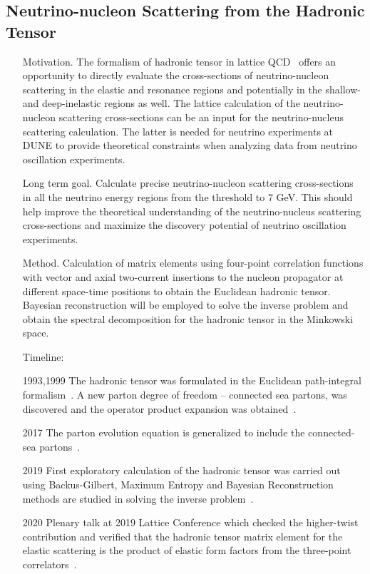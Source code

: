 \documentclass[prd,showpacs,showkeys,preprintnumbers,floatfix,
nofootinbib%
]{revtex4-2}
\begin{document}
\subsection{Neutrino-nucleon Scattering from the Hadronic Tensor}
\begin{itemize}
    \item[Motivation.] The formalism of hadronic tensor in lattice QCD~\cite{Liu:1993cv,Liu:1999ak} offers an opportunity to directly evaluate the cross-sections of neutrino-nucleon scattering in the elastic and resonance regions and potentially in the shallow- and deep-inelastic regions as well. The lattice calculation of the neutrino-nucleon scattering cross-sections can be an input for the neutrino-nucleus scattering calculation. The latter is needed for neutrino experiments at DUNE to provide theoretical constraints when analyzing data from neutrino oscillation experiments.
    \item[Long term goal.] Calculate precise neutrino-nucleon scattering cross-sections in all the neutrino energy regions from the threshold to 7 GeV. This should help improve the theoretical understanding of the neutrino-nucleus scattering cross-sections and maximize the discovery potential of neutrino oscillation experiments.
    \item[Method.]  Calculation of matrix elements using four-point correlation functions with vector and axial two-current insertions to the nucleon propagator at different space-time positions to obtain the Euclidean hadronic tensor. Bayesian reconstruction will be employed to solve the inverse problem and obtain the spectral decomposition for the hadronic tensor in the Minkowski space.
    \item[Timeline:]
    \item[1993,1999] The hadronic tensor was formulated in the Euclidean path-integral formalism~\cite{Liu:1993cv}. A new parton degree of freedom -- connected sea partons, was discovered and the operator product expansion was obtained~\cite{Liu:1999ak}.
  \item[2017] The parton evolution equation is generalized to include the connected-sea partons~\cite{Liu:2017lpe}.
    \item[2019] First exploratory calculation of the hadronic tensor was carried out using Backus-Gilbert, Maximum Entropy and Bayesian Reconstruction methods are studied in solving the inverse problem~\cite{Liang:2019frk}.
    \item[2020] Plenary talk at 2019 Lattice Conference which checked the higher-twist contribution and verified that the hadronic tensor matrix element for the elastic scattering is the product of elastic form factors from the three-point correlators~\cite{Liang:2020sqi}.

\end{itemize}
\end{document}
